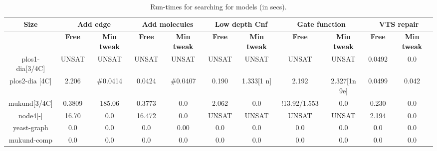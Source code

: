 
\begin{table}[t]
  \centering
  \begin{tabular}[t]{|c|c|c|c|c|c|c|c|c|c|c}\hline
    {\multirow{2}{*} \textbf{Size}}  & \multicolumn{2}{c|}{\textbf{Add edge}} & \multicolumn{2}{c|}{\textbf{Add molecules}} & \multicolumn{2}{c|}{\textbf{Low depth Cnf}}  &  \multicolumn{2}{c|}{\textbf{Gate function}} &  \multicolumn{2}{c|}{\textbf{VTS repair}} \\\hline
   
   \cline{2-9}
    {} & {\textbf{Free}} & {\textbf{Min tweak}} & {\textbf{Free}} & {\textbf{Min tweak}} & {\textbf{Free}} & {\textbf{Min tweak}} & {\textbf{Free}} & {\textbf{Min tweak}} & {\textbf{Free}} & {\textbf{Min tweak}} \\\hline
    
    plos1-dia[3/4C] & UNSAT & UNSAT & UNSAT & UNSAT & UNSAT & UNSAT & UNSAT & UNSAT & 0.0492 & 0.0\\\hline
    plos2-dia [4C] & 2.206 & \#0.0414 & 0.0424 & \#0.0407 & 0.190 & 1.333[1 n] & 2.192 & 2.327[1n 9e] & 0.0499 & 0.042 \\\hline
    mukund[3/4C] & 0.3809 & 185.06 & 0.3773 & 0.0 & 2.062 & 0.0 & !13.92/1.553 & 0.0 & 0.230 & 0.0 \\\hline
    node4[-] & 16.70 & 0.0 & 16.472 & 0.0 & UNSAT & UNSAT & UNSAT & UNSAT & 2.194 & 0.0\\\hline
    yeast-graph & 0.0 & 0.0 & 0.0 & 0.00 & 0.0 & 0.0 & 0.0  & 0.0 & 0.0 & 0.0 \\\hline
    mukund-comp & 0.0 & 0.0 & 0.0 & 0.0 & 0.0 & 0.0 & 0.0 & 0.0 & 0.0 & 0.0\\\hline
  \end{tabular}
  \caption{Run-times for searching for models (in secs).}
  \label{tab:qf-grabh}
\end{table}

